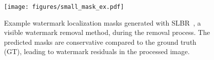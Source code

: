\begin{figure}[t]
    \centering
    \texttt{[image: figures/small\_mask\_ex.pdf]}
    \caption{Example watermark localization masks generated with SLBR~\cite{liang2021visible}, a visible watermark removal method, during the removal process. The predicted masks are conservative compared to the ground truth (GT), leading to watermark residuals in the processed image.}
    \label{fig:mask_ex}
\end{figure}